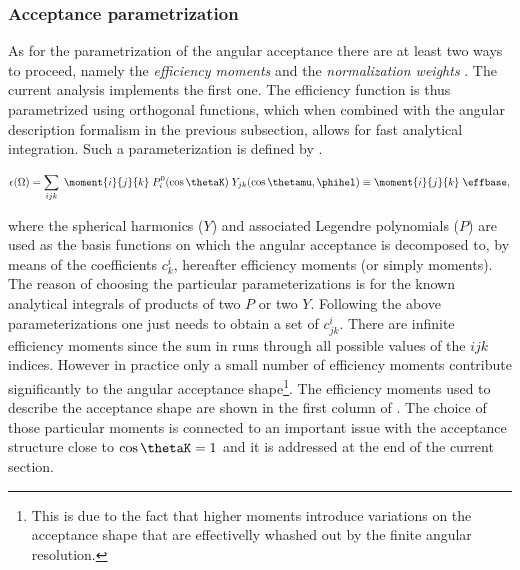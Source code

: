 \subsubsection{Acceptance parametrization}
\label{Acceptance parametrization}
As for the parametrization of the angular acceptance there are at least two ways to proceed,
namely the \emph{efficiency moments} \cite{jeroenThesis} and the \emph{normalization weights} \cite{tristanThesis,jeroenThesis}.
The current analysis implements the first one. The efficiency function is thus parametrized using orthogonal functions,
which when combined with the angular description formalism in the previous subsection, allows for fast analytical
integration. Such a parameterization is defined by .

\begin{equation}
  \centering
  \epsilon(\Omega) = \sum_{ijk} \; \moment{i}{j}{k} \; P_i^0(\cos\thetaK) \; Y_{jk}(\cos\thetamu,\phihel) \equiv \moment{i}{j}{k} \; \effbase,
  \label{eff_func}
\end{equation}

\noindent where the spherical harmonics ($Y$) and associated Legendre polynomials ($P$) are used as the basis
functions on which the angular acceptance is decomposed to, by means of the coefficients $c^i_{k}$, hereafter efficiency moments (or simply moments).
The reason of choosing the particular parameterizations is for the known analytical integrals of products of two $P$ or two $Y$.
Following the above parameterizations one just needs to obtain a set of $c^i_{jk}$. There are infinite efficiency moments
since the sum in  runs through all possible values of the $ijk$ indices. However in practice only a small number of efficiency moments
contribute significantly to the angular acceptance shape\footnote{This is due to the fact that higher moments introduce
variations on the acceptance shape that are effectivelly whashed out by the finite angular resolution.}.
The efficiency moments used to describe the acceptance shape are shown in the first column of .
The choice of those particular moments is connected to an important issue with the acceptance
structure close to $\cos\thetaK=1$ and it is addressed at the end of the current section.

